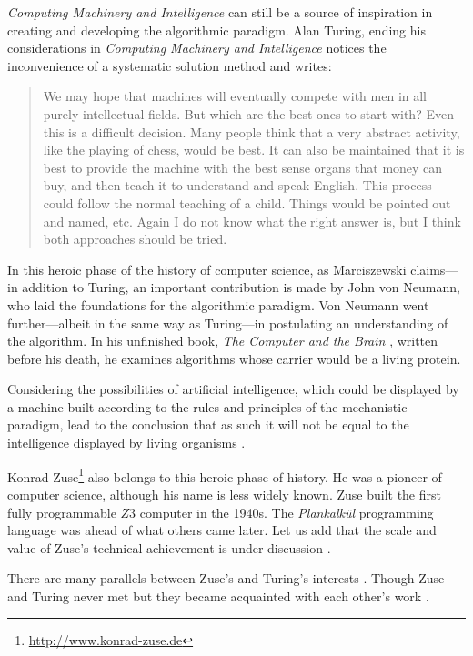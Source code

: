 \documentclass[pdftex,12pt]{article}
\begin{document}
\emph{Computing Machinery and Intelligence} \parencite*{Turing1950} can still be a source of inspiration in creating and developing the algorithmic  paradigm. Alan Turing, ending his considerations in \emph{Computing Machinery and Intelligence} \parencite*[p.64]{Turing1950} notices the inconvenience of a systematic solution method and writes: \begin{quote} \small We may hope that machines will eventually compete with men in all purely intellectual fields. But which are the best ones to start with? Even this is a difficult decision. Many people think that a very abstract activity, like the playing of chess, would be best. It can also be maintained that it is best to provide the machine with the best sense organs that money can buy, and then teach it to understand and speak English. This process could follow the normal teaching of a child. Things would be pointed out and named, etc. Again I do not know what the right answer is, but I think both approaches should be tried. \end{quote}

In this heroic phase of the history of computer science, as Marciszewski \parencite*[p.165]{MarciszewskiStacewicz2011} claims---in addition to Turing, an important contribution is made by John von Neumann, who laid the foundations for the algorithmic  paradigm. Von Neumann went further---albeit in the same way as Turing---in postulating an understanding of the algorithm. In his unfinished book, \emph{The Computer and the Brain} \parencite*{vonNeumann1958}, written before his death, he examines algorithms whose carrier would be a living protein.

Considering the possibilities of artificial intelligence, which could be displayed by a machine built according to the rules and principles of the mechanistic paradigm, lead to the conclusion that as such it will not be equal to the intelligence displayed by living organisms \parencite{Trzesicki2006slgr}.


 Konrad Zuse\footnote{\url{http://www.konrad-zuse.de}}  also belongs to this heroic phase of history. He was a pioneer of computer science, although his name is less widely known. Zuse built the first fully programmable $Z3$ computer in the 1940s. The \textit{Plankalk{\"u}l} programming language was ahead of what others came later. Let us add that the scale and value of Zuse's technical achievement is under discussion \parencite[p.448]{CopelandSprevakShagrir2017}.

There are many parallels between Zuse's and Turing's interests \parencite[p.58]{Zuse2012a}. Though Zuse and Turing never met but they became acquainted with each other’s
work \parencite[p.60]{German2012}.
\end{document}

